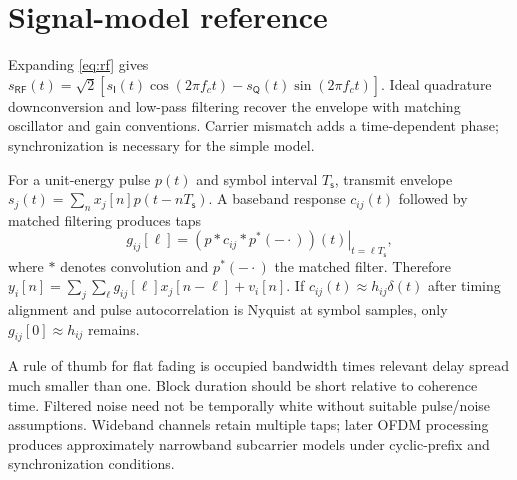 \clearpage
\section{Signal-model reference}\label{app:signals}
Expanding \eqref{eq:rf} gives $s_{\mathsf{RF}}(t)=\sqrt2[s_{\mathsf I}(t)\cos(2\pi f_ct)-s_{\mathsf Q}(t)\sin(2\pi f_ct)]$. Ideal quadrature downconversion and low-pass filtering recover the envelope with matching oscillator and gain conventions. Carrier mismatch adds a time-dependent phase; synchronization is necessary for the simple model.

For a unit-energy pulse $p(t)$ and symbol interval $T_{\mathsf s}$, transmit envelope $s_j(t)=\sum_nx_j[n]p(t-nT_{\mathsf s})$. A baseband response $c_{ij}(t)$ followed by matched filtering produces taps
\begin{equation}
g_{ij}[\ell]=\left.(p*c_{ij}*p^*(-\cdot))(t)\right|_{t=\ell T_{\mathsf s}},
\end{equation}
where $*$ denotes convolution and $p^*(-\cdot)$ the matched filter. Therefore $y_i[n]=\sum_j\sum_\ell g_{ij}[\ell]x_j[n-\ell]+v_i[n]$. If $c_{ij}(t)\approx h_{ij}\delta(t)$ after timing alignment and pulse autocorrelation is Nyquist at symbol samples, only $g_{ij}[0]\approx h_{ij}$ remains.

A rule of thumb for flat fading is occupied bandwidth times relevant delay spread much smaller than one. Block duration should be short relative to coherence time. Filtered noise need not be temporally white without suitable pulse/noise assumptions. Wideband channels retain multiple taps; later OFDM processing produces approximately narrowband subcarrier models under cyclic-prefix and synchronization conditions.

\clearpage
